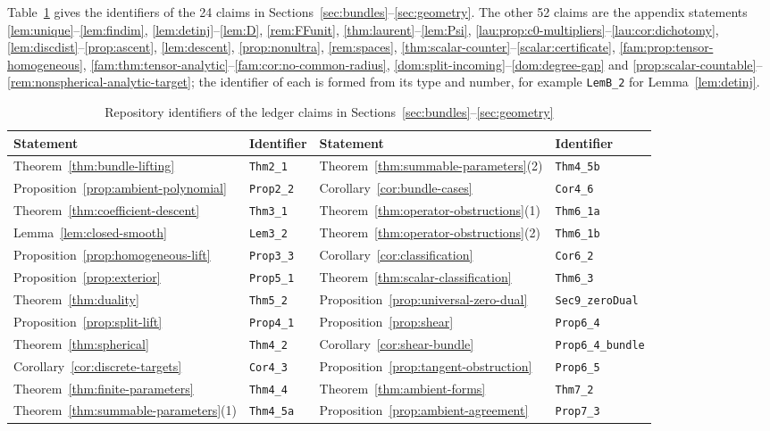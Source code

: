 \documentclass[11pt]{amsart}
\theoremstyle{definition}
\theoremstyle{remark}
\numberwithin{equation}{section}
\theoremstyle{plain}
\theoremstyle{definition}
\theoremstyle{plain}
\begin{document}
Table~\ref{ver:tab:ids} gives the identifiers of the 24 claims in Sections~\ref{sec:bundles}--\ref{sec:geometry}. The
other 52 claims are the appendix statements \ref{lem:unique}--\ref{lem:findim}, \ref{lem:detinj}--\ref{lem:D},
\ref{rem:FFunit}, \ref{thm:laurent}--\ref{lem:Psi}, \ref{lau:prop:c0-multipliers}--\ref{lau:cor:dichotomy},
\ref{lem:discdist}--\ref{prop:ascent}, \ref{lem:descent}, \ref{prop:nonultra}, \ref{rem:spaces},
\ref{thm:scalar-counter}--\ref{scalar:certificate}, \ref{fam:prop:tensor-homogeneous},
\ref{fam:thm:tensor-analytic}--\ref{fam:cor:no-common-radius}, \ref{dom:split-incoming}--\ref{dom:degree-gap} and
\ref{prop:scalar-countable}--\ref{rem:nonspherical-analytic-target}; the identifier of each is formed from its type and
number, for example \texttt{LemB\_2} for Lemma~\ref{lem:detinj}.

\begin{table}[htbp]
\centering
\small
\caption{Repository identifiers of the ledger claims in Sections~\ref{sec:bundles}--\ref{sec:geometry}}\label{ver:tab:ids}
\begin{tabular}{ll@{\qquad}ll}
\hline
Statement & Identifier & Statement & Identifier\\
\hline
Theorem~\ref{thm:bundle-lifting} & \texttt{Thm2\_1} & Theorem~\ref{thm:summable-parameters}(2) & \texttt{Thm4\_5b}\\
Proposition~\ref{prop:ambient-polynomial} & \texttt{Prop2\_2} & Corollary~\ref{cor:bundle-cases} & \texttt{Cor4\_6}\\
Theorem~\ref{thm:coefficient-descent} & \texttt{Thm3\_1} & Theorem~\ref{thm:operator-obstructions}(1) & \texttt{Thm6\_1a}\\
Lemma~\ref{lem:closed-smooth} & \texttt{Lem3\_2} & Theorem~\ref{thm:operator-obstructions}(2) & \texttt{Thm6\_1b}\\
Proposition~\ref{prop:homogeneous-lift} & \texttt{Prop3\_3} & Corollary~\ref{cor:classification} & \texttt{Cor6\_2}\\
Proposition~\ref{prop:exterior} & \texttt{Prop5\_1} & Theorem~\ref{thm:scalar-classification} & \texttt{Thm6\_3}\\
Theorem~\ref{thm:duality} & \texttt{Thm5\_2} & Proposition~\ref{prop:universal-zero-dual} & \texttt{Sec9\_zeroDual}\\
Proposition~\ref{prop:split-lift} & \texttt{Prop4\_1} & Proposition~\ref{prop:shear} & \texttt{Prop6\_4}\\
Theorem~\ref{thm:spherical} & \texttt{Thm4\_2} & Corollary~\ref{cor:shear-bundle} & \texttt{Prop6\_4\_bundle}\\
Corollary~\ref{cor:discrete-targets} & \texttt{Cor4\_3} & Proposition~\ref{prop:tangent-obstruction} & \texttt{Prop6\_5}\\
Theorem~\ref{thm:finite-parameters} & \texttt{Thm4\_4} & Theorem~\ref{thm:ambient-forms} & \texttt{Thm7\_2}\\
Theorem~\ref{thm:summable-parameters}(1) & \texttt{Thm4\_5a} & Proposition~\ref{prop:ambient-agreement} & \texttt{Prop7\_3}\\
\hline
\end{tabular}
\end{table}
\end{document}
